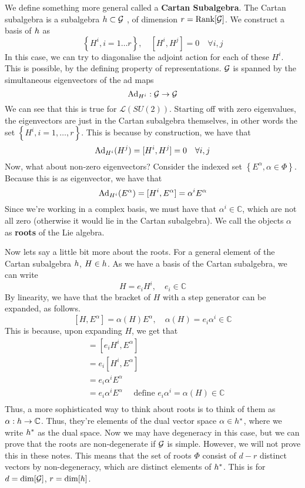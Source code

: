 We define something more general called a \textbf{Cartan Subalgebra}. 
The Cartan subalgebra is a subalgebra $ h \subset \mathcal{ G } $ ,
of dimension $ r = \text{Rank} [ \mathcal{ G } ] $. 
We construct a basis of $ h $ as 
\[
	\left\{  H ^ i , i =1 \dots r  \right\} , \quad [ H ^ i , H ^ j ]  =0 \quad \forall 
	i , j 
\] In this case, we can try to diagonalise the adjoint
action for each of these $ H ^ i $. This is possible, by the defining 
property of representations.
 $ \mathcal{ G } $ is spanned by the simultaneous eigenvectors of the ad maps 
 \[
  \text{Ad}_{ H ^ i } : \mathcal{ G } \to \mathcal{ G } 
 \] We can see that this is 
 true for $ \mathcal{ L } ( SU ( 2) ) $.
 Starting off with zero eigenvalues, the eigenvectors are just in the Cartan 
 subalgebra themselves, in other words the set $\left\{ H ^ i , i = 1 , \dots ,r   \right\} $. 
 This is because by construction, we have that 
 \[
	 \text{Ad} _{ H ^ i } ( H ^ j ) = [ H ^ i , H ^ j ] = 0 \quad \forall i , j 
 \] Now, what about non-zero eigenvectors? 
 Consider the indexed set $ \left\{  E ^ \alpha , \alpha \in \Phi  \right\} $. 
 Because this is as eigenvector, we have that 
 \[
	 \text{Ad}_{ H ^  i } ( E ^{ \alpha } ) = [ H ^ i , E ^{ \alpha } ] = \alpha ^ i E ^ \alpha  
 \] Since we're working in a complex basis, we must have that 
 $ \alpha ^ i \in \mathbb{ C} $, which are not all zero (otherwise it 
 would lie in the Cartan subalgebra). We call the objects $ \alpha $ as 
 \textbf{ roots } of the Lie algebra. 

 Now lets say a little bit more about the roots. 
 For a general element of the Cartan subalgebra $ h $, 
 $ H \in h$. As we have a basis of the Cartan subalgebra, 
 we can write 
 \[
  H = e_ i H ^ i , \quad e _ i \in \mathbb{ C} 
 \] By linearity, we have that the bracket of $ H $ with a step generator 
 can be expanded, as follows. 
 \[
	 [ H , E ^ \alpha ] = \alpha ( H ) E ^{\alpha } , \quad \alpha ( H ) = e_ i \alpha ^ i \in 
	 \mathbb{ C} 
 \] This is because, upon expanding $ H $, we get that 
 \begin{align*}
	 [ H , E ^ \alpha ] &=   [ e_ i H ^ i, E ^ \alpha ]  \\
			    &= e_ i [ H ^ i , E ^ \alpha ]  \\
			    &=  e_i \alpha ^ i E ^ \alpha  \\
			    &=  e _ i \alpha ^ i E^ \alpha  \quad 
			    \text{ define } e_ i \alpha ^ i  = \alpha ( H ) \in \mathbb{ C}  \\ 
 \end{align*}Thus, a more sophisticated way to think about roots
 is to think of them as $ \alpha : h \to \mathbb{ C}  $. 
 Thus, they're elements of the dual vector space 
 $ \alpha \in h ^ * $, where we write $ h ^ * $ as 
  the dual space. Now we may have degeneracy in this case,
  but we can prove that the roots are non-degenerate if 
  $ \mathcal{ G } $ is simple. However, we will not prove this in these
  notes. 
  This means that the set of roots $ \Phi$ consist of  $ d - r $ 
  distinct vectors by non-degeneracy, which are distinct elements 
  of $ h ^ * $. This is for $ d  = \dim [ \mathcal{ G } ] $, $ r = \dim [ h ] $. 

